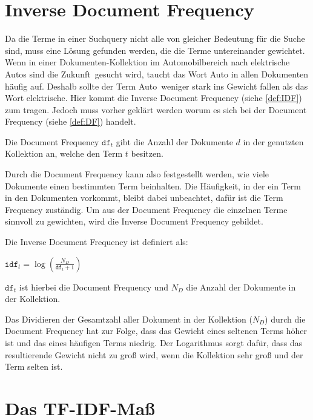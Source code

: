 \section{Inverse Document Frequency}
Da die Terme in einer Suchquery nicht alle von gleicher Bedeutung für die Suche sind, muss eine Lösung gefunden werden, die die Terme untereinander gewichtet. Wenn in einer Dokumenten-Kollektion im Automobilbereich nach \glqq elektrische Autos sind die Zukunft\grqq\ gesucht wird, taucht das Wort Auto in allen Dokumenten häufig auf. Deshalb sollte der Term \glqq Auto\grqq\ weniger stark ins Gewicht fallen als das Wort \glqq elektrische\grqq. Hier kommt die Inverse Document Frequency (siehe \cref{def:IDF}) zum tragen. Jedoch muss vorher geklärt werden worum es sich bei der Document Frequency (siehe \cref{def:DF}) handelt.

\begin{defi}\cite[S. 118]{IR_Intro_Cambridge}\label{def:DF}
	Die Document Frequency $\mathtt{df}_t$ gibt die Anzahl der Dokumente $d$ in der genutzten Kollektion an, welche den Term $t$ besitzen.
\end{defi}
\newpage
Durch die Document Frequency kann also festgestellt werden, wie viele Dokumente einen bestimmten Term beinhalten. Die Häufigkeit, in der ein Term in den Dokumenten vorkommt, bleibt dabei unbeachtet, dafür ist die Term Frequency zuständig. Um aus der Document Frequency die einzelnen Terme sinnvoll zu gewichten, wird die Inverse Document Frequency gebildet. 

\begin{defi}\cite[S. 118]{IR_Intro_Cambridge}\label{def:IDF}
	Die Inverse Document Frequency ist definiert als:
	\begin{center}
		$\displaystyle \mathtt{idf}_t = \log(\frac{N_D}{\mathtt{df}_t+1})$
	\end{center}
	$\mathtt{df}_t$ ist hierbei die Document Frequency und $N_D$ die Anzahl der Dokumente in der Kollektion.
\end{defi}

Das Dividieren der Gesamtzahl aller Dokument in der Kollektion ($N_D$) durch die Document Frequency hat zur Folge, dass das Gewicht eines seltenen Terms höher ist und das eines häufigen Terms niedrig. Der Logarithmus sorgt dafür, dass das resultierende Gewicht nicht zu groß wird, wenn die Kollektion sehr groß und der Term selten ist.

\section{Das TF-IDF-Maß}

